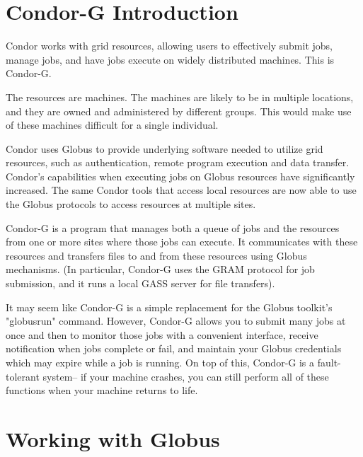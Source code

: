 \section{\label{sec:Condor-G-Intro}Condor-G Introduction}

Condor works with grid resources, allowing users to
effectively submit jobs, manage jobs, and have jobs execute
on widely distributed machines.
This is Condor-G.

The resources are machines.
The machines are likely to be in multiple locations, and
they are owned and administered by different groups. 
This would make use of these machines difficult for a
single individual.

Condor uses 
Globus to provide underlying software needed to utilize
grid resources, such as authentication, remote program
execution and data transfer.
Condor's capabilities when executing jobs on Globus resources have
significantly increased.
The same Condor tools that access local resources 
are now able to use the Globus protocols to access resources at multiple
sites. 

Condor-G is a program that manages both a queue of jobs
and the resources from one or more sites where those jobs can execute. 
It communicates with these resources and transfers files
to and from these resources using Globus mechanisms.
(In particular, Condor-G uses the GRAM protocol for job submission,
and it runs a local GASS server for file transfers).

It may seem like Condor-G is a simple replacement
for the Globus toolkit's "globusrun" command.
However, Condor-G allows you to submit many jobs at once
and then to monitor those jobs with a convenient interface,
receive notification when jobs complete or fail,
and maintain your Globus credentials
which may expire while a job is running.
On top of this, Condor-G is a fault-tolerant system--
if your machine crashes,
you can still perform all of these functions when your machine returns to life.

\section{\label{sec:Globus-intro}Working with Globus}

